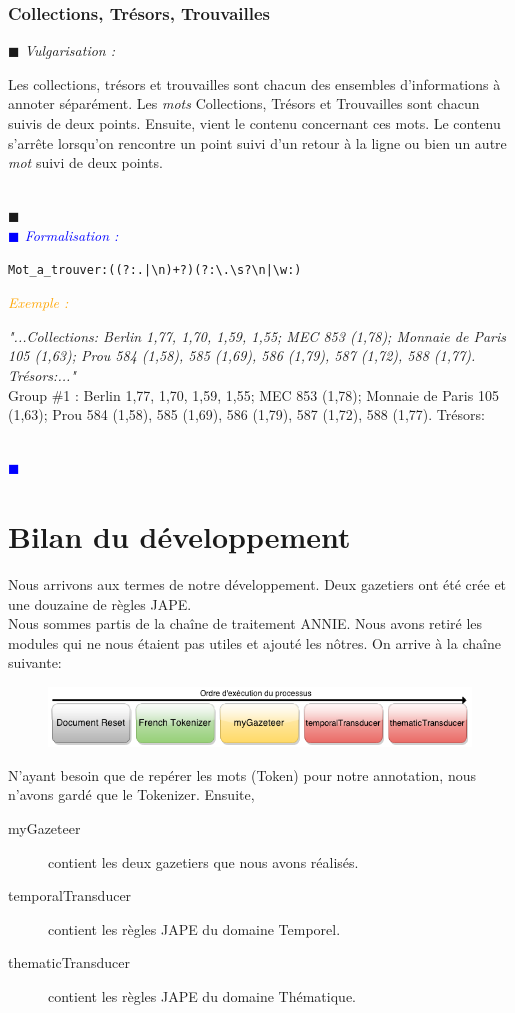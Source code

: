 \documentclass[a4paper, 11pt]{report}
\newenvironment{vulgarisation}
    {
    \textit{\textcolor{dark-blue}{$\blacksquare$  Vulgarisation : \\}}

    }
    {
    ~\\\textcolor{dark-blue}{$\blacksquare$}\\
    }
\newenvironment{formalisation}
    {
    \textit{\textcolor{blue}{$\blacksquare$  Formalisation : \\}}
    }
    {
    ~\\\textcolor{blue}{$\blacksquare$}\\
    }
\newenvironment{exemple}
    {
    \textit{\textcolor{orange}{
    Exemple : \\}}
    }
    {~\\
    }
\begin{document}
\subsubsection{Collections, Trésors, Trouvailles}
\begin{vulgarisation}
Les collections, trésors et trouvailles sont chacun des ensembles d'informations à annoter séparément.
	Les \textit{mots} Collections, Trésors et Trouvailles sont chacun suivis de deux points. Ensuite, vient le contenu concernant ces mots. Le contenu s'arrête lorsqu'on rencontre un point suivi d'un retour à la ligne ou bien un autre \textit{mot} suivi de deux points.
\end{vulgarisation}
\begin{formalisation}
	\begin{verbatim}
Mot_a_trouver:((?:.|\n)+?)(?:\.\s?\n|\w:)
	\end{verbatim}
	\begin{exemple}
		\emph{"...Collections: Berlin 1,77, 1,70, 1,59,
			1,55; MEC 853 (1,78); Monnaie de Paris 105 (1,63); Prou 584 (1,58), 585 (1,69), 586 (1,79), 587 
			(1,72), 588 (1,77). Trésors:..."}\\
		Group \#1 :  Berlin 1,77, 1,70, 1,59,
		1,55; MEC 853 (1,78); Monnaie de Paris 105 (1,63); Prou 584 (1,58), 585 (1,69), 586 (1,79), 587 (1,72), 588 (1,77). Trésors:
	\end{exemple}
\end{formalisation}

\section{Bilan du développement}
Nous arrivons aux termes de notre développement. Deux gazetiers ont été crée et une douzaine de règles JAPE.\\
Nous sommes partis de la chaîne de traitement ANNIE. Nous avons retiré les modules qui ne nous étaient pas utiles et ajouté les nôtres. On arrive à la chaîne suivante:
\begin{figure}[H]
\centering
\includegraphics[scale=.5]{img/notreChaine.png}
\end{figure}
N'ayant besoin que de repérer les mots (Token) pour notre annotation, nous n'avons gardé que le Tokenizer. Ensuite, 
\begin{description}
\item[myGazeteer] contient les deux gazetiers que nous avons réalisés.
\item[temporalTransducer] contient les règles JAPE du domaine Temporel.
\item[thematicTransducer] contient les règles JAPE du domaine Thématique.
\end{description}
\end{document}
